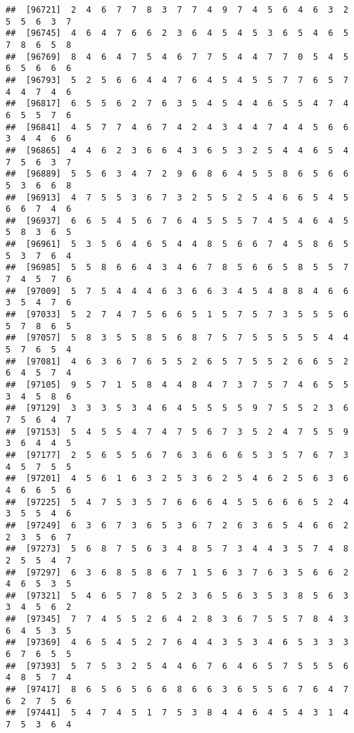 \documentclass[
]{book}
\begin{document}
\begin{verbatim}
##  [96721]  2  4  6  7  7  8  3  7  7  4  9  7  4  5  6  4  6  3  2  5  5  6  3  7
##  [96745]  4  6  4  7  6  6  2  3  6  4  5  4  5  3  6  5  4  6  5  7  8  6  5  8
##  [96769]  8  4  6  4  7  5  4  6  7  7  5  4  4  7  7  0  5  4  5  6  5  6  6  6
##  [96793]  5  2  5  6  6  4  4  7  6  4  5  4  5  5  7  7  6  5  7  4  4  7  4  6
##  [96817]  6  5  5  6  2  7  6  3  5  4  5  4  4  6  5  5  4  7  4  6  5  5  7  6
##  [96841]  4  5  7  7  4  6  7  4  2  4  3  4  4  7  4  4  5  6  6  3  4  4  6  6
##  [96865]  4  4  6  2  3  6  6  4  3  6  5  3  2  5  4  4  6  5  4  7  5  6  3  7
##  [96889]  5  5  6  3  4  7  2  9  6  8  6  4  5  5  8  6  5  6  6  5  3  6  6  8
##  [96913]  4  7  5  5  3  6  7  3  2  5  5  2  5  4  6  6  5  4  5  6  6  7  4  6
##  [96937]  6  6  5  4  5  6  7  6  4  5  5  5  7  4  5  4  6  4  5  5  8  3  6  5
##  [96961]  5  3  5  6  4  6  5  4  4  8  5  6  6  7  4  5  8  6  5  5  3  7  6  4
##  [96985]  5  5  8  6  6  4  3  4  6  7  8  5  6  6  5  8  5  5  7  7  4  5  7  6
##  [97009]  5  7  5  4  4  4  6  3  6  6  3  4  5  4  8  8  4  6  6  3  5  4  7  6
##  [97033]  5  2  7  4  7  5  6  6  5  1  5  7  5  7  3  5  5  5  6  5  7  8  6  5
##  [97057]  5  8  3  5  5  8  5  6  8  7  5  7  5  5  5  5  5  4  4  5  7  6  5  4
##  [97081]  4  6  3  6  7  6  5  5  2  6  5  7  5  5  2  6  6  5  2  6  4  5  7  4
##  [97105]  9  5  7  1  5  8  4  4  8  4  7  3  7  5  7  4  6  5  5  3  4  5  8  6
##  [97129]  3  3  3  5  3  4  6  4  5  5  5  5  9  7  5  5  2  3  6  7  5  6  4  7
##  [97153]  5  4  5  5  4  7  4  7  5  6  7  3  5  2  4  7  5  5  9  3  6  4  4  5
##  [97177]  2  5  6  5  5  6  7  6  3  6  6  6  5  3  5  7  6  7  3  4  5  7  5  5
##  [97201]  4  5  6  1  6  3  2  5  3  6  2  5  4  6  2  5  6  3  6  4  6  6  5  6
##  [97225]  5  4  7  5  3  5  7  6  6  6  4  5  5  6  6  6  5  2  4  3  5  5  4  6
##  [97249]  6  3  6  7  3  6  5  3  6  7  2  6  3  6  5  4  6  6  2  2  3  5  6  7
##  [97273]  5  6  8  7  5  6  3  4  8  5  7  3  4  4  3  5  7  4  8  2  5  5  4  7
##  [97297]  6  3  6  8  5  8  6  7  1  5  6  3  7  6  3  5  6  6  2  4  6  5  3  5
##  [97321]  5  4  6  5  7  8  5  2  3  6  5  6  3  5  3  8  5  6  3  3  4  5  6  2
##  [97345]  7  7  4  5  5  2  6  4  2  8  3  6  7  5  5  7  8  4  3  6  4  5  3  5
##  [97369]  4  6  5  4  5  2  7  6  4  4  3  5  3  4  6  5  3  3  3  6  7  6  5  5
##  [97393]  5  7  5  3  2  5  4  4  6  7  6  4  6  5  7  5  5  5  6  4  8  5  7  4
##  [97417]  8  6  5  6  5  6  6  8  6  6  3  6  5  5  6  7  6  4  7  6  2  7  5  6
##  [97441]  5  4  7  4  5  1  7  5  3  8  4  4  6  4  5  4  3  1  4  7  5  3  6  4

\end{verbatim}
\end{document}
